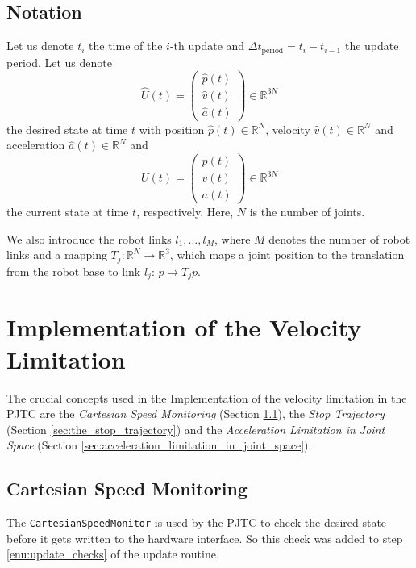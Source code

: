 \documentclass{article}
\begin{document}
\subsection{Notation}
Let us denote $t_i$ the time of the $i$-th update and $\Delta t_{\mathrm{period}}=t_i-t_{i-1}$ the update period. Let us denote
\begin{equation}
\hat{U}(t)=\left(\begin{array}{c}\hat{p}(t)\\\hat{v}(t)\\\hat{a}(t)\end{array}\right)\in\mathbb{R}^{3N}
\end{equation}
the desired state at time $t$ with position $\hat{p}(t)\in\mathbb{R}^N$, velocity $\hat{v}(t)\in\mathbb{R}^N$ and acceleration $\hat{a}(t)\in\mathbb{R}^N$ and
\begin{equation}
U(t)=\left(\begin{array}{c}p(t)\\v(t)\\a(t)\end{array}\right)\in\mathbb{R}^{3N}
\end{equation}
the current state at time $t$, respectively. Here, $N$ is the number of joints.

We also introduce the robot links $l_1, \dots, l_M$, where $M$ denotes the number of robot links and a mapping $T_{j}:\mathbb{R}^N\to\mathbb{R}^3$, which maps a joint position to the translation from the robot base to link $l_j$: $p\mapsto T_{j}p$.


\section{Implementation of the Velocity Limitation}
The crucial concepts used in the Implementation of the velocity limitation in the PJTC are the \emph{Cartesian Speed Monitoring} (Section \ref{sec:cartesian_speed_monitoring}), the \emph{Stop Trajectory} (Section \ref{sec:the_stop_trajectory}) and the \emph{Acceleration Limitation in Joint Space} (Section \ref{sec:acceleration_limitation_in_joint_space}).

\subsection{Cartesian Speed Monitoring}\label{sec:cartesian_speed_monitoring}
The \verb!CartesianSpeedMonitor! is used by the PJTC to check the desired state before it gets written to the hardware interface. So this check was added to step \ref{enu:update_checks} of the update routine.
\end{document}
